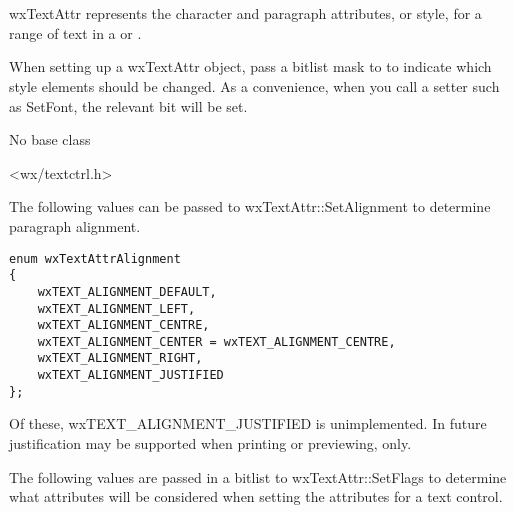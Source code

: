 \section{}\label{wxtextattr}

wxTextAttr represents the character and paragraph attributes, or style,
for a range of text in a  or .

When setting up a wxTextAttr object, pass a bitlist mask to  to
indicate which style elements should be changed. As a convenience, when you call a setter such
as SetFont, the relevant bit will be set.


No base class


<wx/textctrl.h>




The following values can be passed to wxTextAttr::SetAlignment to determine
paragraph alignment.

{\small
\begin{verbatim}
enum wxTextAttrAlignment
{
    wxTEXT_ALIGNMENT_DEFAULT,
    wxTEXT_ALIGNMENT_LEFT,
    wxTEXT_ALIGNMENT_CENTRE,
    wxTEXT_ALIGNMENT_CENTER = wxTEXT_ALIGNMENT_CENTRE,
    wxTEXT_ALIGNMENT_RIGHT,
    wxTEXT_ALIGNMENT_JUSTIFIED
};
\end{verbatim}
}

Of these, wxTEXT\_ALIGNMENT\_JUSTIFIED is unimplemented. In future justification may be supported
when printing or previewing, only.

The following values are passed in a bitlist to wxTextAttr::SetFlags to determine
what attributes will be considered when setting the attributes
for a text control.

